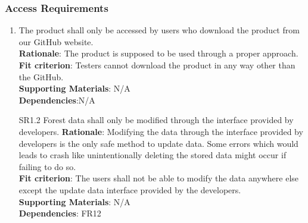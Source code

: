 \documentclass{article}
\begin{document}
\subsubsection{Access Requirements}
\begin{enumerate}[SR1.1]
    \item The product shall only be accessed by users who download the product from our
     GitHub website.\\
    \textbf{Rationale}: The product is supposed to be used through a proper approach.\\
    \textbf{Fit criterion}: Testers cannot download the product in any way other than the GitHub.\\
\textbf{Supporting Materials}: N/A\\
\textbf{Dependencies}:N/A\\
    
    \item[SR1.2]Forest
    data shall only be modified through the interface provided by developers.
    \textbf{Rationale}: Modifying the data through the interface provided by developers is the only safe method to update data. Some errors which would leads to crash like unintentionally deleting the stored data might occur if failing to do so.\\
    \textbf{Fit criterion}: The users shall not be able to modify the data anywhere else except the update data interface provided by the developers.\\
\textbf{Supporting Materials}: N/A\\
\textbf{Dependencies}: FR12\\

\end{enumerate}
\end{document}
